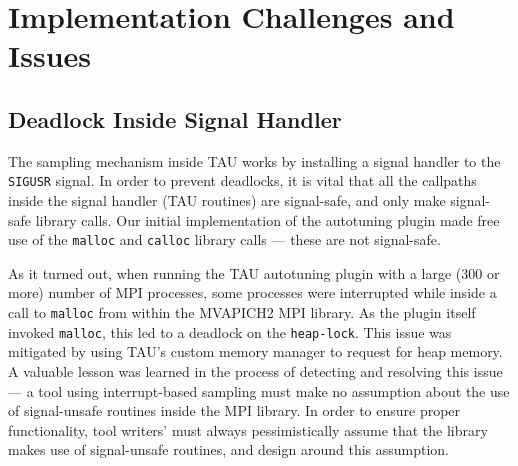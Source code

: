 \section{Implementation Challenges and Issues}
\subsection{Deadlock Inside Signal Handler} 
The sampling mechanism inside TAU works by installing a signal handler to the \verb+SIGUSR+ signal. In order to prevent deadlocks, it is vital that all the callpaths inside the signal handler (TAU routines) are signal-safe, and only make signal-safe library calls. Our initial implementation of the autotuning plugin made free use of the \verb+malloc+ and \verb+calloc+ library calls --- these are not signal-safe. 
\par As it turned out, when running the TAU autotuning plugin with a large (300 or more) number of MPI processes, some processes were interrupted while inside a call to \verb+malloc+ from within the MVAPICH2 MPI library. As the plugin itself invoked \verb+malloc+, this led to a deadlock on the \verb+heap-lock+. This issue was mitigated by using TAU's custom memory manager to request for heap memory. A valuable lesson was learned in the process of detecting and resolving this issue --- a tool using interrupt-based sampling must make no assumption about the use of signal-unsafe routines inside the MPI library. In order to ensure proper functionality, tool writers' must always pessimistically assume that the library makes use of signal-unsafe routines, and design around this assumption.

